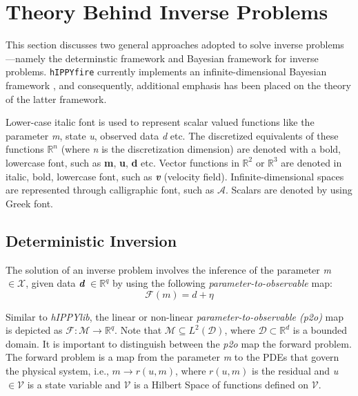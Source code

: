 \chapter{Theory Behind Inverse Problems}
\label{chapter: inverse-problems}
This section discusses two general approaches adopted to solve inverse problems---namely the determinstic framework \cite{laloy2019gradient, vogel2002deterministic} and Bayesian framework \cite{dashti2017bayesian, stuart2010inverse} for inverse problems. \texttt{hIPPYfire} currently implements an infinite-dimensional Bayesian framework \cite{thanh2013infinitebayesian}, and consequently, additional emphasis has been placed on the theory of the latter framework.

Lower-case italic font is used to represent scalar valued functions like the parameter \textit{m}, state \textit{u}, observed data \textit{d} etc. The discretized equivalents of these functions $\mathbb{R}^n$ (where \textit{n} is the discretization dimension) are denoted with a bold, lowercase font, such as \textbf{m}, \textbf{u}, \textbf{d} etc. Vector functions in $\mathbb{R}^2$ or $\mathbb{R}^3$ are denoted in italic, bold, lowercase font, such as \textbf{\textit{v}} (velocity field). Infinite-dimensional spaces are represented through calligraphic font, such as $\mathcal{A}$. Scalars are denoted by using Greek font.


\section{Deterministic Inversion}
\label{sec:det_inversion}

The solution of an inverse problem involves the inference of the parameter \textit{m} $\in \mathcal{X}$, given data \textit{\textbf{d}} $ \in \mathbb{R}^q$ by using the following \textit{parameter-to-observable} map:
\begin{equation}
\label{eqn:fwd_map}
    \mathcal{F}(m) = d + \eta
\end{equation}

Similar to \textit{hIPPYlib}, the linear or non-linear \textit{parameter-to-observable (p2o)} map is depicted as $\mathcal{F} : \mathcal{M} \rightarrow \mathbb{R}^q$. Note that $\mathcal{M} \subseteq L^2(\mathcal{D})$, where $\mathcal{D} \subset \mathbb{R}^d$ is a bounded domain.  It is important to distinguish between the \textit{p2o} map the forward problem. The forward problem is a map from the parameter \textit{m} to the PDEs that govern the physical system, i.e., $m \rightarrow r(u, m)$, where $r(u, m)$ is the residual and \textit{u} $\in \mathcal{V}$ is a state variable and $\mathcal{V}$ is a Hilbert Space of functions defined on $\mathcal{V}$.

